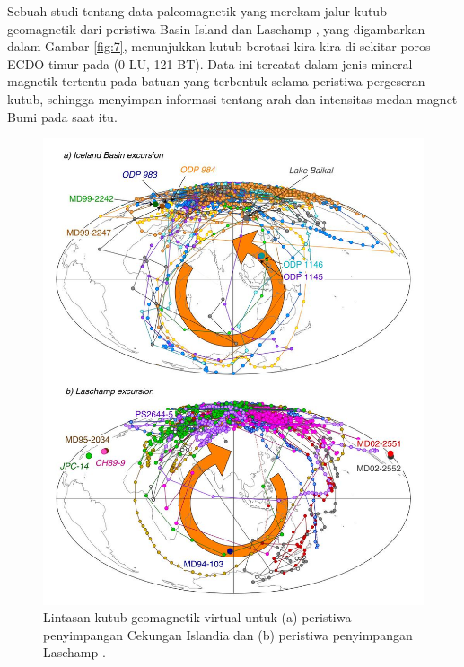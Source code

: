 \documentclass[10pt,twocolumn,letterpaper]{article}
\begin{document}
Sebuah studi tentang data paleomagnetik yang merekam jalur kutub geomagnetik dari peristiwa Basin Island dan Laschamp \cite{35}, yang digambarkan dalam Gambar \ref{fig:7}, menunjukkan kutub berotasi kira-kira di sekitar poros ECDO timur pada (0 LU, 121 BT). Data ini tercatat dalam jenis mineral magnetik tertentu pada batuan yang terbentuk selama peristiwa pergeseran kutub, sehingga menyimpan informasi tentang arah dan intensitas medan magnet Bumi pada saat itu.
\begin{figure}[t]
\begin{center}
   \includegraphics[width=0.95\linewidth]{laj.jpg}
\end{center}
   \caption{Lintasan kutub geomagnetik virtual untuk (a) peristiwa penyimpangan Cekungan Islandia dan (b) peristiwa penyimpangan Laschamp \cite{35}.}
\label{fig:7}
\label{fig:onecol}
\end{figure}
\end{document}
